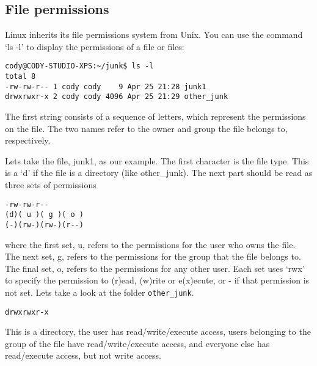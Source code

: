 \documentclass{article}
\begin{document}
\subsection{File permissions}
Linux inherits its file permissions system from Unix. You can use the command `ls -l' to display the permissions of a file or files:
\begin{verbatim}
cody@CODY-STUDIO-XPS:~/junk$ ls -l
total 8
-rw-rw-r-- 1 cody cody    9 Apr 25 21:28 junk1
drwxrwxr-x 2 cody cody 4096 Apr 25 21:29 other_junk
\end{verbatim}
The first string consists of a sequence of letters, which represent the permissions on the file. The two names refer to the owner and group the file belongs to, respectively.

Lets take the file, junk1, as our example.
The first character is the file type. This is a `d' if the file is a directory (like other\_junk).
The next part should be read as three sets of permissions
\begin{verbatim}
-rw-rw-r--
(d)( u )( g )( o ) 
(-)(rw-)(rw-)(r--)
\end{verbatim} 
where the first set, u, refers to the permissions for the user who owns the file.
The next set, g, refers to the permissions for the group that the file belongs to.
The final set, o, refers to the permissions for any other user. 
Each set uses `rwx' to specify the permission to (r)ead, (w)rite or e(x)ecute, or - if that permission is not set.
Lets take a look at the folder \texttt{other_junk}.
\begin{verbatim}
drwxrwxr-x
\end{verbatim}
This is a directory, the user has read/write/execute access, users belonging to the group of the file have read/write/execute access, and everyone else has read/execute access, but not write access.
\end{document}
